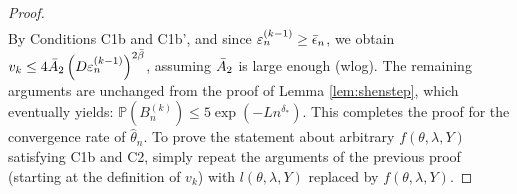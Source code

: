\documentclass[12pt]{article}
\theoremstyle{myplain}
\theoremstyle{definition}
\theoremstyle{definition}
\theoremstyle{remark}
\numberwithin{equation}{section}
\begin{document}
\begin{proof}
\begin{equation*}
\begin{aligned}
\end{aligned}
\end{equation*}
By Conditions C1b and C1b', and since $\varepsilon_{n}^{(k-1)}\geq {\Bar\epsilon}_n$, we obtain $v_{k} \leq 4 \Bar A_{2}\left(D \varepsilon_{n}^{(k-1)}\right)^{2 {\Bar\beta}}$, assuming $\Bar A_2$ is large enough (wlog). The remaining arguments are unchanged from the proof of Lemma \ref{lem:shenstep}, which eventually yields: $\mathbb{P}\left(B_{n}^{(k)}\right) \leq 5 \exp \left(-L {n}^{\delta_*}\right)$. This completes the proof for the convergence rate of $\widehat{\theta}_n$. To prove the statement about arbitrary $f(\theta, \lambda, Y)$ satisfying C1b and C2, simply repeat the arguments of the previous proof (starting at the definition of $v_k$) with $l(\theta, \lambda, Y)$ replaced by $f(\theta, \lambda, Y)$. 
\end{proof}
\end{document}
